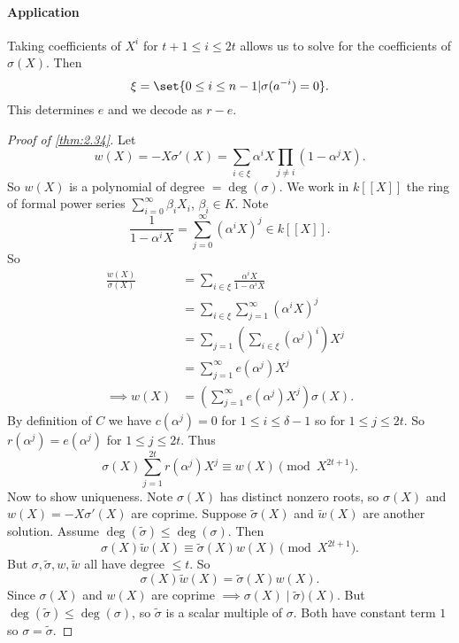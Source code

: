 \documentclass{article}
\newcommand{\1}[1]{\mathbbm{1}_{#1}}
\begin{document}
\paragraph{Application}
Taking coefficients of $X^i$ for $t+1 \leq i \leq 2t$ allows us to solve for the coefficients of $\sigma(X)$. Then
\begin{equation*}
    \xi = \set{0 \leq i \leq n-1 | \sigma(a^{-i}) = 0}.
\end{equation*}
This determines $e$ and we decode as $r-e$.
\begin{proof}[Proof of \cref{thm:2.34}]
    Let
    \begin{equation*}
        w(X) = -X \sigma'(X) = \sum_{i \in \xi} \alpha^i X \prod_{j \neq i} (1 - \alpha^j X).
    \end{equation*}
    So $w(X)$ is a polynomial of degree $=\deg(\sigma)$.
    We work in $k[[X]]$ the ring of formal power series $\sum_{i=0}^\infty \beta_i X_i$, $\beta_i \in K$.
    Note
    \begin{equation*}
        \frac{1}{1 - \alpha^i X} = \sum_{j=0}^\infty (\alpha^i X)^j \in k[[X]].
    \end{equation*}
    So
    \begin{align*}
        \frac{w(X)}{\sigma(X)} &= \sum_{i \in \xi} \frac{\alpha^i X}{1 - \alpha^i X} \\
                               &= \sum_{i \in \xi} \sum_{j=1}^\infty (\alpha^i X)^j \\
                               &= \sum_{j=1} \left(\sum_{i\in \xi} (\alpha^j)^i\right) X^j \\
                               &= \sum_{j=1}^\infty e(\alpha^j) X^j \\
        \implies w(X) &= \left(\sum_{j=1}^\infty e(\alpha^j) X^j \right) \sigma(X).
    \end{align*}
    By definition of $C$ we have $c(\alpha^j) = 0$ for $1 \leq i \leq \delta-1$ so for $1 \leq j \leq 2t$.
    So $r(\alpha^j) = e(\alpha^j)$ for $1 \leq j \leq 2t$.  Thus
    \begin{equation*}
        \sigma(X) \sum_{j=1}^{2t} r(\alpha^j) X^j \equiv w(X) \pmod{X^{2t+1}}.
    \end{equation*}
    Now to show uniqueness.
    Note $\sigma(X)$ has distinct nonzero roots, so $\sigma(X)$ and $w(X) = -X \sigma'(X)$ are coprime.
    Suppose $\tilde{\sigma}(X)$ and $\tilde{w}(X)$ are another solution.
    Assume $\deg(\tilde{\sigma}) \leq \deg(\sigma)$. Then
    \begin{equation*}
        \sigma(X) \tilde{w}(X) \equiv \tilde{\sigma}(X) w(X) \pmod{X^{2t+1}}.
    \end{equation*}
    But $\sigma, \tilde{\sigma}, w, \tilde{w}$ all have degree $\leq t$. So
    \begin{equation*}
        \sigma(X) \tilde{w}(X) = \tilde{\sigma}(X) w(X).
    \end{equation*}
    Since $\sigma(X)$ and $w(X)$ are coprime $\implies \sigma(X) \mid \tilde{\sigma})(X)$.
    But $\deg(\tilde{\sigma}) \leq \deg(\sigma)$, so $\tilde{\sigma}$ is a scalar multiple of $\sigma$.
    Both have constant term $1$ so $\sigma = \tilde{\sigma}$.
\end{proof}
\end{document}
